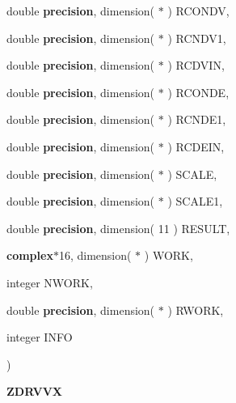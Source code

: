 {\begin{DoxyParamCaption}
\item[{double {\bf precision}, dimension( $\ast$ )}]{R\+C\+O\+N\+D\+V, }
\item[{double {\bf precision}, dimension( $\ast$ )}]{R\+C\+N\+D\+V1, }
\item[{double {\bf precision}, dimension( $\ast$ )}]{R\+C\+D\+V\+I\+N, }
\item[{double {\bf precision}, dimension( $\ast$ )}]{R\+C\+O\+N\+D\+E, }
\item[{double {\bf precision}, dimension( $\ast$ )}]{R\+C\+N\+D\+E1, }
\item[{double {\bf precision}, dimension( $\ast$ )}]{R\+C\+D\+E\+I\+N, }
\item[{double {\bf precision}, dimension( $\ast$ )}]{S\+C\+A\+L\+E, }
\item[{double {\bf precision}, dimension( $\ast$ )}]{S\+C\+A\+L\+E1, }
\item[{double {\bf precision}, dimension( 11 )}]{R\+E\+S\+U\+L\+T, }
\item[{{\bf complex}$\ast$16, dimension( $\ast$ )}]{W\+O\+R\+K, }
\item[{integer}]{N\+W\+O\+R\+K, }
\item[{double {\bf precision}, dimension( $\ast$ )}]{R\+W\+O\+R\+K, }
\item[{integer}]{I\+N\+F\+O}
\end{DoxyParamCaption}
)}\label{group__complex16__eig_gad219aa578f2f410c3431c8d3642c28cb}


{\bfseries Z\+D\+R\+V\+V\+X} 

